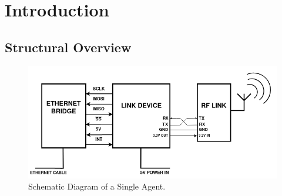 

\chapter{Introduction}


\section{Structural Overview}

\begin{figure}[H]
\begin{center}
\includegraphics[width=1\textwidth]{schematic-diagram}
\end{center}
\caption{Schematic Diagram of a Single Agent.}
\label{fig-pin}
\end{figure}

